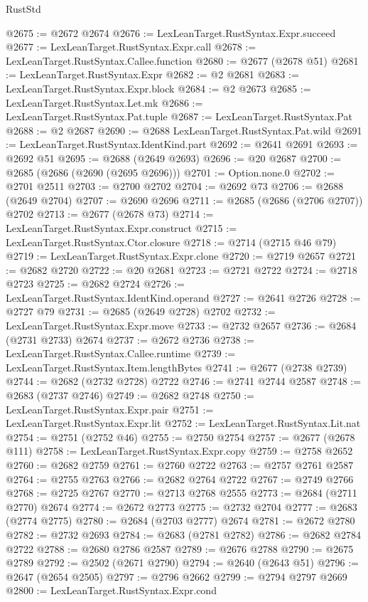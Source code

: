 \begin{lexlean}{RustStd}
\begin{coremodule}
@2675 := @2672 @2674
@2676 := LexLeanTarget.RustSyntax.Expr.succeed
@2677 := LexLeanTarget.RustSyntax.Expr.call
@2678 := LexLeanTarget.RustSyntax.Callee.function
@2680 := @2677 (@2678 @51)
@2681 := LexLeanTarget.RustSyntax.Expr
@2682 := @2 @2681
@2683 := LexLeanTarget.RustSyntax.Expr.block
@2684 := @2 @2673
@2685 := LexLeanTarget.RustSyntax.Let.mk
@2686 := LexLeanTarget.RustSyntax.Pat.tuple
@2687 := LexLeanTarget.RustSyntax.Pat
@2688 := @2 @2687
@2690 := @2688 LexLeanTarget.RustSyntax.Pat.wild
@2691 := LexLeanTarget.RustSyntax.IdentKind.part
@2692 := @2641 @2691
@2693 := @2692 @51
@2695 := @2688 (@2649 @2693)
@2696 := @20 @2687
@2700 := @2685 (@2686 (@2690 (@2695 @2696)))
@2701 := Option.none.{0}
@2702 := @2701 @2511
@2703 := @2700 @2702
@2704 := @2692 @73
@2706 := @2688 (@2649 @2704)
@2707 := @2690 @2696
@2711 := @2685 (@2686 (@2706 @2707)) @2702
@2713 := @2677 (@2678 @73)
@2714 := LexLeanTarget.RustSyntax.Expr.construct
@2715 := LexLeanTarget.RustSyntax.Ctor.closure
@2718 := @2714 (@2715 @46 @79)
@2719 := LexLeanTarget.RustSyntax.Expr.clone
@2720 := @2719 @2657
@2721 := @2682 @2720
@2722 := @20 @2681
@2723 := @2721 @2722
@2724 := @2718 @2723
@2725 := @2682 @2724
@2726 := LexLeanTarget.RustSyntax.IdentKind.operand
@2727 := @2641 @2726
@2728 := @2727 @79
@2731 := @2685 (@2649 @2728) @2702
@2732 := LexLeanTarget.RustSyntax.Expr.move
@2733 := @2732 @2657
@2736 := @2684 (@2731 @2733) @2674
@2737 := @2672 @2736
@2738 := LexLeanTarget.RustSyntax.Callee.runtime
@2739 := LexLeanTarget.RustSyntax.Item.lengthBytes
@2741 := @2677 (@2738 @2739)
@2744 := @2682 (@2732 @2728) @2722
@2746 := @2741 @2744 @2587
@2748 := @2683 (@2737 @2746)
@2749 := @2682 @2748
@2750 := LexLeanTarget.RustSyntax.Expr.pair
@2751 := LexLeanTarget.RustSyntax.Expr.lit
@2752 := LexLeanTarget.RustSyntax.Lit.nat
@2754 := @2751 (@2752 @46)
@2755 := @2750 @2754
@2757 := @2677 (@2678 @111)
@2758 := LexLeanTarget.RustSyntax.Expr.copy
@2759 := @2758 @2652
@2760 := @2682 @2759
@2761 := @2760 @2722
@2763 := @2757 @2761 @2587
@2764 := @2755 @2763
@2766 := @2682 @2764 @2722
@2767 := @2749 @2766
@2768 := @2725 @2767
@2770 := @2713 @2768 @2555
@2773 := @2684 (@2711 @2770) @2674
@2774 := @2672 @2773
@2775 := @2732 @2704
@2777 := @2683 (@2774 @2775)
@2780 := @2684 (@2703 @2777) @2674
@2781 := @2672 @2780
@2782 := @2732 @2693
@2784 := @2683 (@2781 @2782)
@2786 := @2682 @2784 @2722
@2788 := @2680 @2786 @2587
@2789 := @2676 @2788
@2790 := @2675 @2789
@2792 := @2502 (@2671 @2790)
@2794 := @2640 (@2643 @51)
@2796 := @2647 (@2654 @2505)
@2797 := @2796 @2662
@2799 := @2794 @2797 @2669
@2800 := LexLeanTarget.RustSyntax.Expr.cond

\end{coremodule}
\end{lexlean}
